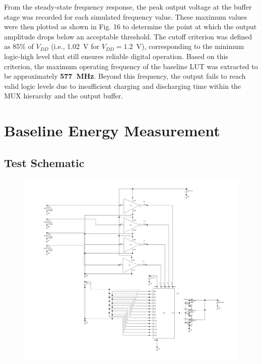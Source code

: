 \documentclass[12pt]{article}
\begin{document}
From the steady-state frequency response, the peak output voltage at the buffer stage was recorded for each simulated frequency value. These maximum values were then plotted as shown in Fig. 16 to determine the point at which the output amplitude drops below an acceptable threshold. The cutoff criterion was defined as 85\% of $V_{DD}$ (i.e., 1.02~V for $V_{DD}=1.2$~V), corresponding to the minimum logic-high level that still ensures reliable digital operation. Based on this criterion, the maximum operating frequency of the baseline LUT was extracted to be approximately \textbf{577~MHz}. Beyond this frequency, the output fails to reach valid logic levels due to insufficient charging and discharging time within the MUX hierarchy and the output buffer.

\newpage

\section{Baseline Energy Measurement}
\subsection{Test Schematic}

\begin{figure}[H]
    \centering
    \includegraphics[width=\linewidth]{writeup//figures/lut_energy_testbench.png}
    \caption{}
\end{figure}
\end{document}
